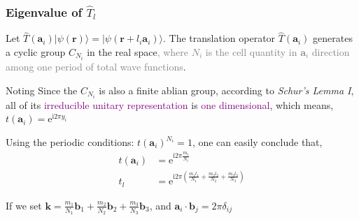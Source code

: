 \documentclass{beamer}
\begin{document}
  \begin{frame}
  \frametitle{Eigenvalue of \(\widehat{T}_l\)}
  
  Let \(\widehat{T}(\mathbf{a}_i) |\psi(\mathbf{r})\rangle = |\psi(\mathbf{r}+l_i\mathbf{a}_i)\rangle\). The translation operator \(\widehat{T}(\mathbf{a}_i)\) generates a cyclic group \(C_{N_i}\) in the real space\textcolor{gray}{, where \(N_i\) is the cell quantity in \(\mathbf{a}_i\) direction among one period of total wave functions}.

  \begin{block}{Noting}
    Since the \(C_{N_i}\) is also a finite ablian group, according to \emph{Schur's Lemma I}, all of its \textcolor{purple}{irreducible unitary representation} is \textcolor{purple}{one dimensional}, which means, \(t(\mathbf{a}_i) = \mathrm{e}^{\mathrm{i}2\pi{}y_i}\)
  \end{block}

  Using the periodic conditions: \(t(\mathbf{a}_i)^{N_i}=1\), one can easily conclude that, 
  \begin{subequations}
    \begin{align}
      t(\mathbf{a}_i) &= \mathrm{e}^{\mathrm{i}2\pi{}\frac{m_i}{N_i}}\\
      t_l &= \mathrm{e}^{\mathrm{i}2\pi{}\left(\frac{m_1l_1}{N_1}+\frac{m_2l_2}{N_2}+\frac{m_3l_3}{N_3}\right)}
    \end{align}
  \end{subequations}

  If we set \(\mathbf{k} = \frac{m_1}{N_1}\mathbf{b}_1+\frac{m_2}{N_2}\mathbf{b}_2+\frac{m_3}{N_3}\mathbf{b}_3\), and \(\mathbf{a}_i\cdot\mathbf{b}_j = 2\pi\delta_{ij}\)

  \end{frame}
\end{document}
